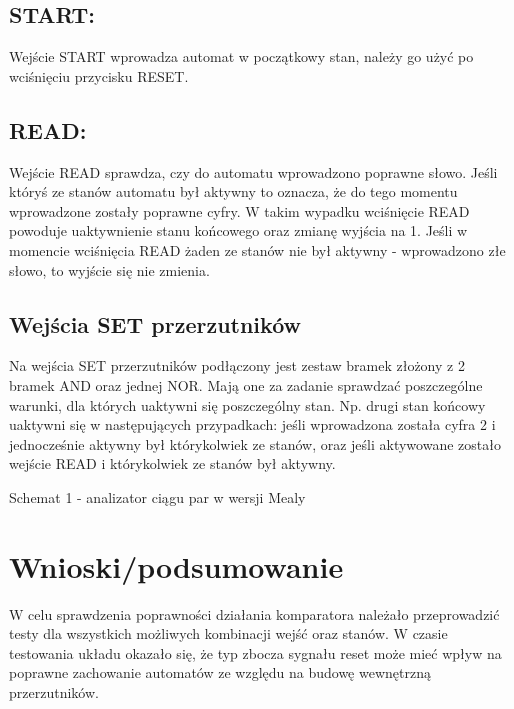 \documentclass[12pt,a4paper]{article}
\begin{document}
		\subsection{START:}
			Wejście START wprowadza automat w początkowy stan, należy go użyć po wciśnięciu przycisku RESET. 

		\subsection{READ:}
			Wejście READ sprawdza, czy do automatu wprowadzono poprawne słowo.
			Jeśli któryś ze stanów automatu był aktywny to oznacza, że do tego momentu wprowadzone zostały poprawne cyfry.
			W takim wypadku wciśnięcie READ powoduje uaktywnienie stanu końcowego oraz zmianę wyjścia na 1.
			Jeśli w momencie wciśnięcia READ żaden ze stanów nie był aktywny - wprowadzono złe słowo, to wyjście się nie zmienia.

		\subsection{Wejścia SET przerzutników}
			Na wejścia SET przerzutników podłączony jest zestaw bramek złożony z 2 bramek AND oraz jednej NOR.
			Mają one za zadanie sprawdzać poszczególne warunki, dla których uaktywni się poszczególny stan.
			Np. drugi stan końcowy uaktywni się w następujących przypadkach: jeśli wprowadzona została cyfra 2 i jednocześnie aktywny był którykolwiek ze stanów,
			oraz jeśli aktywowane zostało wejście READ i którykolwiek ze stanów był aktywny.

		\vspace{1.5cm}
		\begin{center}
			Schemat 1 - analizator ciągu par w wersji Mealy
		\end{center}

	\section{Wnioski/podsumowanie}
	
			W celu sprawdzenia poprawności działania komparatora należało przeprowadzić testy dla wszystkich możliwych kombinacji wejść oraz stanów. W czasie testowania układu okazało się, że typ zbocza sygnału reset może mieć
			wpływ na poprawne zachowanie automatów ze względu na budowę wewnętrzną przerzutników. 
	
\end{document}
